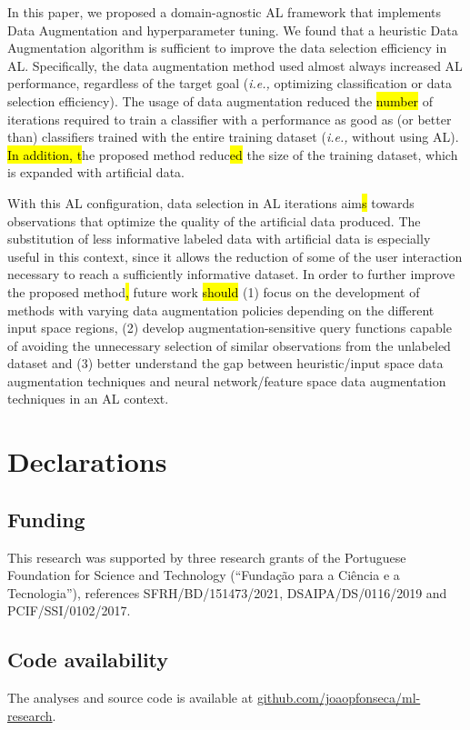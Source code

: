 \documentclass[preprint, 12pt]{elsarticle}
\begin{document}
In this paper, we proposed a domain-agnostic AL framework that implements Data
Augmentation and hyperparameter tuning. We found that a heuristic Data
Augmentation algorithm is sufficient to improve the data selection efficiency
in AL\@. Specifically, the data augmentation method used almost always
increased AL performance, regardless of the target goal (\textit{i.e.,}
optimizing classification or data selection efficiency). The usage of data
augmentation reduced the \hl{number} of iterations required to train a
classifier with a performance as good as (or better than) classifiers trained
with the entire training dataset (\textit{i.e.,} without using AL). \hl{In
addition, t}he proposed method reduc\hl{ed} the size of the training dataset,
which is expanded with artificial data. 

With this AL configuration, data selection in AL iterations aim\hl{s} towards
observations that optimize the quality of the artificial data produced. The
substitution of less informative labeled data with artificial data is
especially useful in this context, since it allows the reduction of some of
the user interaction necessary to reach a sufficiently informative dataset.
In order to further improve the proposed method\hl{,} future work \hl{should}
(1) focus on the development of methods with varying data augmentation
policies depending on the different input space regions, (2) develop
augmentation-sensitive query functions capable of avoiding the unnecessary
selection of similar observations from the unlabeled dataset and (3) better
understand the gap between heuristic/input space data augmentation techniques
and neural network/feature space data augmentation techniques in an AL
context.

\section*{Declarations}

\subsection*{Funding}

This research was supported by three research grants of the Portuguese Foundation
for Science and Technology (``Fundação para a Ciência e a Tecnologia''),
references SFRH/BD/151473/2021, DSAIPA/DS/0116/2019 and PCIF/SSI/0102/2017.

\subsection*{Code availability}

The analyses and source code is available at
\href{https://github.com/joaopfonseca/ml-research}{github.com/joaopfonseca/ml-research}.



\end{document}
